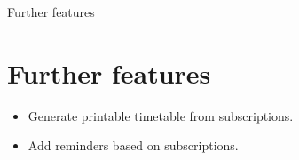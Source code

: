 \documentclass{beamer}
\begin{document}
\begin{frame}{Further features}

	\section{Further features}
	
	\begin{itemize}
		\item Generate printable timetable from subscriptions.
		\item Add reminders based on subscriptions.
	\end{itemize}
\end{frame}
	
\end{document}
